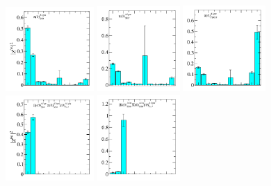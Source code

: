 \begin{figure}
  \includegraphics[width=0.3\textwidth]{figures/spectrum_a1gm/no_tq/zfactors/zfactor_pion-P000-A1gm_1-SS_0.pdf}
  \includegraphics[width=0.28\textwidth]{figures/spectrum_a1gm/no_tq/zfactors/zfactor_pion-P000-A1gm_1-SD_2.pdf}
  \includegraphics[width=0.28\textwidth]{figures/spectrum_a1gm/no_tq/zfactors/zfactor_pion-P000-A1gm_1-TDO_3.pdf}\\
  \includegraphics[width=0.3\textwidth]{figures/spectrum_a1gm/no_tq/zfactors/zfactor_isotriplet_phi_pion-A1gm_1-P000-A1up-SS_0-P000-A1um-SS_0.pdf}
  \includegraphics[width=0.28\textwidth]{figures/spectrum_a1gm/no_tq/zfactors/zfactor_isotriplet_kaon_kbar-A1gm_1-P000-A1u-SS_0-P000-A1u-SS_0.pdf}

\end{figure}
